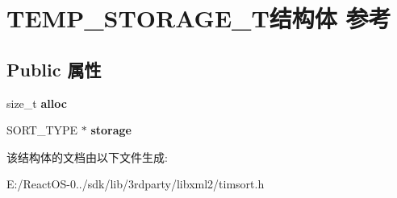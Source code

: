 \hypertarget{struct_t_e_m_p___s_t_o_r_a_g_e___t}{}\section{T\+E\+M\+P\+\_\+\+S\+T\+O\+R\+A\+G\+E\+\_\+\+T结构体 参考}
\label{struct_t_e_m_p___s_t_o_r_a_g_e___t}
\subsection*{Public 属性}
\begin{DoxyCompactItemize}
\item 
\mbox{\label{struct_t_e_m_p___s_t_o_r_a_g_e___t_a150c41f3a8c4f93a7ead05d536cc5d83}} 
size\+\_\+t {\bfseries alloc}
\item 
\mbox{\label{struct_t_e_m_p___s_t_o_r_a_g_e___t_ae72d4324f8e80c8b8ff07436f4ff2ee1}} 
S\+O\+R\+T\+\_\+\+T\+Y\+PE $\ast$ {\bfseries storage}
\end{DoxyCompactItemize}


该结构体的文档由以下文件生成\+:\begin{DoxyCompactItemize}
\item 
E\+:/\+React\+O\+S-\/0../sdk/lib/3rdparty/libxml2/timsort.\+h\end{DoxyCompactItemize}
